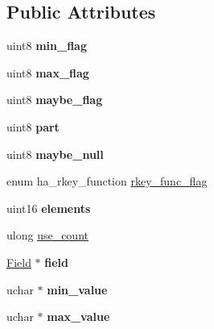 \subsection*{Public Attributes}
\begin{DoxyCompactItemize}
\item 
\mbox{\label{classSEL__ARG_ad18271e49d27d6ee9b254d4a37df69d5}} 
uint8 {\bfseries min\+\_\+flag}
\item 
\mbox{\label{classSEL__ARG_aa68859f875a20efb16e7e0bf2ce23d24}} 
uint8 {\bfseries max\+\_\+flag}
\item 
\mbox{\label{classSEL__ARG_a7a9a88e9c6893170d783d9376e76fc9c}} 
uint8 {\bfseries maybe\+\_\+flag}
\item 
\mbox{\label{classSEL__ARG_a4d93fb42edde425f1240efce5c61d59d}} 
uint8 {\bfseries part}
\item 
\mbox{\label{classSEL__ARG_a212036c3dcefc942ba95228b8c6ae7c6}} 
uint8 {\bfseries maybe\+\_\+null}
\item 
enum ha\+\_\+rkey\+\_\+function \mbox{\hyperlink{classSEL__ARG_a353b0fef57cae5decb392c585a6b5478}{rkey\+\_\+func\+\_\+flag}}
\item 
\mbox{\label{classSEL__ARG_aa901fd16b66edcff769e4a6ec609b363}} 
uint16 {\bfseries elements}
\item 
ulong \mbox{\hyperlink{classSEL__ARG_a3b4bd5d5c82cb443d58ccfc25e1b59e7}{use\+\_\+count}}
\item 
\mbox{\label{classSEL__ARG_a520e822b377a965f3c75f0ab669ce99b}} 
\mbox{\hyperlink{classField}{Field}} $\ast$ {\bfseries field}
\item 
\mbox{\label{classSEL__ARG_a4b824f1fb732c2db5804ed75bcafc94e}} 
uchar $\ast$ {\bfseries min\+\_\+value}
\item 
\mbox{\label{classSEL__ARG_a7e77cd80090827cde174c11cca0b38bd}} 
uchar $\ast$ {\bfseries max\+\_\+value}
\item 
\mbox{\label{classSEL__ARG_aa77fd557343af0f3eec18f3ad035397d}} 

\end{DoxyCompactItemize}
